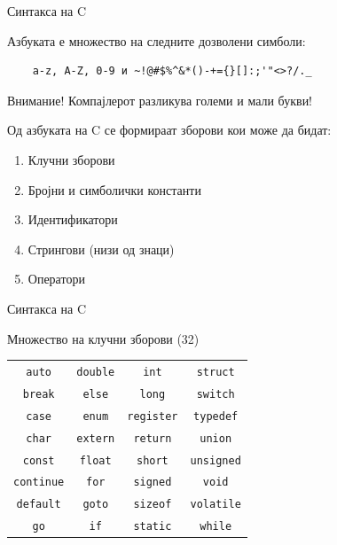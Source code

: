 \begin{frame}[fragile]{Синтакса на C}

  \begin{block}{Азбуката е множество на следните дозволени симболи:}
  \begin{verbatim}
  	a-z, A-Z, 0-9 и ~!@#$%^&*()-+={}[]:;'"<>?/._  
  \end{verbatim}
  \end{block}

	\begin{alertblock}{Внимание!}
	Компајлерот разликува големи и мали букви!
	\end{alertblock}

	Од азбуката на C се формираат зборови кои може да бидат:
	\begin{enumerate}
	\item Клучни зборови
	\item Бројни и симболички константи
	\item Идентификатори
	\item Стрингови (низи од знаци)
	\item Оператори
	\end{enumerate}

\end{frame}

\begin{frame}{Синтакса на C}

  	\begin{block}{Множество на клучни зборови (32)}

  	\begin{tabular}{c c c c}
		\texttt{auto} & \texttt{double} & \texttt{int} & \texttt{struct} \\
		\texttt{break} & \texttt{else} & \texttt{long} & \texttt{switch} \\
		\texttt{case} & \texttt{enum} & \texttt{register} & \texttt{typedef} \\
		\texttt{char} & \texttt{extern} & \texttt{return} & \texttt{union} \\
		\texttt{const} & \texttt{float} & \texttt{short} & \texttt{unsigned} \\
		\texttt{continue} & \texttt{for} & \texttt{signed} & \texttt{void} \\
		\texttt{default} & \texttt{goto} & \texttt{sizeof} & \texttt{volatile} \\
		\texttt{go} & \texttt{if} & \texttt{static} & \texttt{while}
  	\end{tabular}
  	\end{block}
\end{frame}

